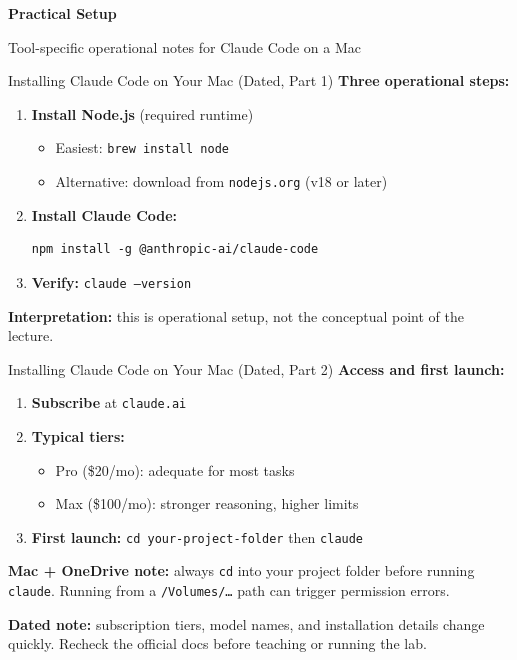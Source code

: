 \documentclass[10pt,english,aspectratio=169]{beamer}
\newcommand{\sectiondivider}[2]{%
\begin{frame}[plain,noframenumbering]
\begin{center}
\vfill
{\Large\textbf{#1}\par}
\vspace{0.35cm}
{\normalsize #2\par}
\vfill
\end{center}
\end{frame}
}
\begin{document}
\sectiondivider{Practical Setup}{Tool-specific operational notes for Claude Code on a Mac}

\begin{frame}[fragile]{Installing Claude Code on Your Mac (Dated, Part 1)}
\textbf{Three operational steps:}

\vspace{0.15cm}
\begin{enumerate}
    \item \textbf{Install Node.js} (required runtime)
    \begin{itemize}
        \item Easiest: \texttt{brew install node}
        \item Alternative: download from \texttt{nodejs.org} (v18 or later)
    \end{itemize}
    \item \textbf{Install Claude Code:}
\begin{lstlisting}[style=pythonstyle,language={},basicstyle=\ttfamily\scriptsize,numbers=none]
npm install -g @anthropic-ai/claude-code
\end{lstlisting}
    \item \textbf{Verify:} \texttt{claude --version}
\end{enumerate}

\vspace{0.2cm}
\textbf{Interpretation:} this is operational setup, not the conceptual point of the lecture.
\end{frame}

\begin{frame}{Installing Claude Code on Your Mac (Dated, Part 2)}
\textbf{Access and first launch:}
\begin{enumerate}
    \item \textbf{Subscribe} at \texttt{claude.ai}
    \item \textbf{Typical tiers:}
    \begin{itemize}
        \item Pro (\$20/mo): adequate for most tasks
        \item Max (\$100/mo): stronger reasoning, higher limits
    \end{itemize}
    \item \textbf{First launch:} \texttt{cd your-project-folder} then \texttt{claude}
\end{enumerate}

\vspace{0.2cm}
\textbf{Mac + OneDrive note:} always \texttt{cd} into your project folder before running \texttt{claude}. Running from a \texttt{/Volumes/\ldots} path can trigger permission errors.

\vspace{0.15cm}
\textbf{Dated note:} subscription tiers, model names, and installation details change quickly. Recheck the official docs before teaching or running the lab.
\end{frame}
\end{document}
